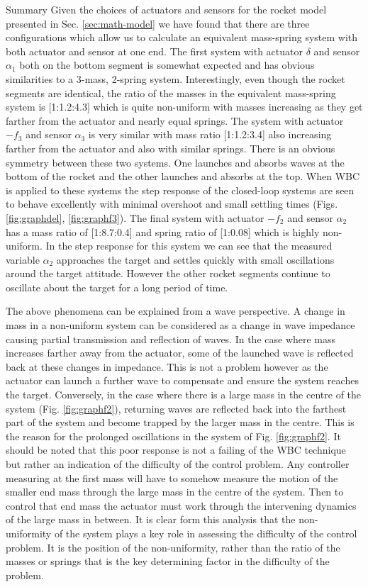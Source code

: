 \documentclass{beamer}
\begin{document}
\begin{frame}{Summary}
Given the choices of actuators and sensors for the rocket model presented in Sec. \ref{sec:math-model} we have found that there are three configurations which allow us to calculate an equivalent mass-spring system with both actuator and sensor at one end.
The first system with actuator $\delta$ and sensor $\alpha_1$ both on the bottom segment is somewhat expected and has obvious similarities to a 3-mass, 2-spring system.
Interestingly, even though the rocket segments are identical, the ratio of the masses in the equivalent mass-spring system is [1:1.2:4.3] which is quite non-uniform with masses increasing as they get farther from the actuator and nearly equal springs.
The system with actuator $-f_3$ and sensor $\alpha_3$ is very similar with mass ratio [1:1.2:3.4] also increasing farther from the actuator and also with similar springs.
There is an obvious symmetry between these two systems.
One launches and absorbs waves at the bottom of the rocket and the other launches and absorbs at the top. 
When WBC is applied to these systems the step response of the closed-loop systems are seen to behave excellently with minimal overshoot and small settling times (Figs. \ref{fig:graphdel}, \ref{fig:graphf3}).
The final system with actuator $-f_2$ and sensor $\alpha_2$ has a mass ratio of [1:8.7:0.4] and spring ratio of [1:0.08] which is highly non-uniform.
In the step response for this system we can see that the measured variable $\alpha_2$ approaches the target and settles quickly with small oscillations around the target attitude.
However the other rocket segments continue to oscillate about the target for a long period of time.

The above phenomena can be explained from a wave perspective.
A change in mass in a non-uniform system can be considered as a change in wave impedance causing partial transmission and reflection of waves.
In the case where mass increases farther away from the actuator, some of the launched wave is reflected back at these changes in impedance.
This is not a problem however as the actuator can launch a further wave to compensate and ensure the system reaches the target.
Conversely, in the case where there is a large mass in the centre of the system (Fig. \ref{fig:graphf2}), returning waves are reflected back into the farthest part of the system and become trapped by the larger mass in the centre.
This is the reason for the prolonged oscillations in the system of Fig. \ref{fig:graphf2}.
It should be noted that this poor response is not a failing of the WBC technique but rather an indication of the difficulty of the control problem.
Any controller measuring at the first mass will have to somehow measure the motion of the smaller end mass through the large mass in the centre of the system.
Then to control that end mass the actuator must work through the intervening dynamics of the large mass in between.
It is clear form this analysis that the non-uniformity of the system plays a key role in assessing the difficulty of the control problem.
It is the position of the non-uniformity, rather than the ratio of the masses or springs that is the key determining factor in the difficulty of the problem.




\end{frame}
\end{document}
